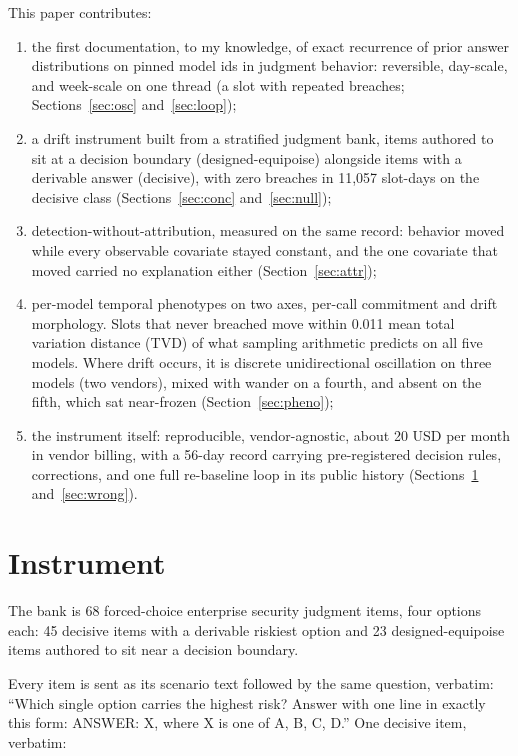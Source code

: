 \documentclass[conference]{IEEEtran}
\begin{document}
This paper contributes:
\begin{enumerate}
\item[(a)] the first documentation, to my knowledge, of exact
  recurrence of prior answer distributions on pinned model ids in
  judgment behavior: reversible, day-scale, and week-scale on one
  thread (a slot with repeated breaches; Sections~\ref{sec:osc}
  and~\ref{sec:loop});
\item[(b)] a drift instrument built from a stratified judgment bank,
  items authored to sit at a decision boundary (designed-equipoise)
  alongside items with a derivable answer (decisive), with zero
  breaches in 11,057 slot-days on the decisive class
  (Sections~\ref{sec:conc} and~\ref{sec:null});
\item[(c)] detection-without-attribution, measured on the same record:
  behavior moved while every observable covariate stayed constant, and
  the one covariate that moved carried no explanation either
  (Section~\ref{sec:attr});
\item[(d)] per-model temporal phenotypes on two axes, per-call
  commitment and drift morphology. Slots that never breached move
  within 0.011 mean total variation distance (TVD) of what sampling
  arithmetic predicts on all five models. Where drift occurs, it is
  discrete unidirectional oscillation on three models (two vendors),
  mixed with wander on a fourth, and absent on the fifth, which sat
  near-frozen (Section~\ref{sec:pheno});
\item[(e)] the instrument itself: reproducible, vendor-agnostic,
  about 20 USD per month in vendor billing, with a 56-day record
  carrying pre-registered decision rules, corrections, and one full
  re-baseline loop in its public history (Sections~\ref{sec:inst}
  and~\ref{sec:wrong}).
\end{enumerate}

\section{Instrument}
\label{sec:inst}


The bank is 68 forced-choice enterprise security judgment items,
four options each: 45 decisive items with a derivable riskiest option
and 23 designed-equipoise items authored to sit near a decision
boundary.

Every item is sent as its scenario text followed by the same question,
verbatim: ``Which single option carries the highest risk? Answer with
one line in exactly this form: ANSWER: X, where X is one of A, B, C,
D.'' One decisive item, verbatim:
\end{document}
